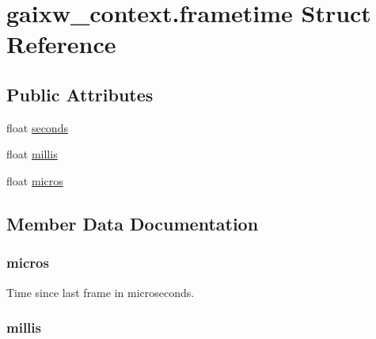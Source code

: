 \hypertarget{structgaixw__context_8frametime}{}\section{gaixw\+\_\+context.\+frametime Struct Reference}
\label{structgaixw__context_8frametime}
\subsection*{Public Attributes}
\begin{DoxyCompactItemize}
\item 
float \hyperlink{structgaixw__context_8frametime_a783e8e29e6a8c3e22baa58a19420eb4f}{seconds}
\item 
float \hyperlink{structgaixw__context_8frametime_a259a879e32720d127d38b39f2f1385b5}{millis}
\item 
float \hyperlink{structgaixw__context_8frametime_a18ae342d1bd803d9ec7c56a3f087d24b}{micros}
\end{DoxyCompactItemize}


\subsection{Member Data Documentation}
\mbox{\label{structgaixw__context_8frametime_a18ae342d1bd803d9ec7c56a3f087d24b}} 
\subsubsection{\texorpdfstring{micros}{micros}}
{\footnotesize\ttfamily }

Time since last frame in microseconds. \mbox{\label{structgaixw__context_8frametime_a259a879e32720d127d38b39f2f1385b5}} 
\subsubsection{\texorpdfstring{millis}{millis}}
{\footnotesize\ttfamily }

